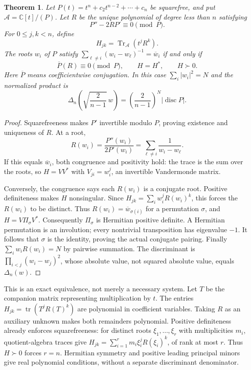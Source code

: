 \documentclass[11pt]{article}
\newtheorem{theorem}{Theorem}[section]
\theoremstyle{remark}
\newcommand{\C}{\mathbb C}
\numberwithin{equation}{section}
\begin{document}
\begin{theorem}\label{thm:trace-stationary}
Let $P(t)=t^n+c_2t^{n-2}+\cdots+c_n$ be squarefree, and put
$\mathcal A=\C[t]/(P)$. Let $R$ be the unique polynomial of degree
less than $n$ satisfying
\begin{equation}\label{eq:force-modulo}
 P''-2RP'\equiv0\pmod P.
\end{equation}
For $0\le j,k<n$, define
\begin{equation}\label{eq:trace-matrix}
 H_{jk}=\operatorname{Tr}_{\mathcal A}(t^jR^k).
\end{equation}
The roots $w_i$ of $P$ satisfy
$\sum_{\ell\ne i}(w_i-w_\ell)^{-1}=\overline w_i$ if and only if
\begin{equation}\label{eq:trace-conditions}
 \overline P(R)\equiv0\pmod P,\qquad H=H^*,\qquad H\succ0.
\end{equation}
Here $\overline P$ means coefficientwise conjugation.
In this case $\sum_i|w_i|^2=N$ and the normalized product is
\begin{equation}\label{eq:disc-normalization}
 \Delta_n\!\left(\sqrt{\frac2{n-1}}\,w\right)
   =\left(\frac2{n-1}\right)^N|\operatorname{disc}P|.
\end{equation}
\end{theorem}
\begin{proof}
Squarefreeness makes $P'$ invertible modulo $P$, proving existence
and uniqueness of $R$. At a root,
\[
 R(w_i)=\frac{P''(w_i)}{2P'(w_i)}
       =\sum_{\ell\ne i}\frac1{w_i-w_\ell}.
\]
If this equals $\overline w_i$, both congruence and positivity hold:
the trace is the sum over the roots, so $H=VV^*$ with
$V_{ji}=w_i^j$, an invertible Vandermonde matrix.

Conversely, the congruence says each $R(w_i)$ is a conjugate root.
Positive definiteness makes $H$ nonsingular. Since
$H_{jk}=\sum_i w_i^jR(w_i)^k$, this forces the $R(w_i)$ to be distinct.
Thus $R(w_i)=\overline w_{\sigma(i)}$ for a permutation $\sigma$, and
$H=V\Pi_\sigma V^*$. Consequently $\Pi_\sigma$ is Hermitian positive
definite. A Hermitian permutation is an involution; every
nontrivial transposition has eigenvalue $-1$. It follows that
$\sigma$ is the identity, proving the actual conjugate pairing.
Finally $\sum_i w_iR(w_i)=N$ by pairwise summation.
The discriminant is $\prod_{i<j}(w_i-w_j)^2$, whose absolute value,
not squared absolute value, equals $\Delta_n(w)$.
\end{proof}

This is an exact equivalence, not merely a necessary system.
Let $T$ be the companion matrix representing multiplication by $t$.
The entries $H_{jk}=\operatorname{tr}(T^jR(T)^k)$ are polynomial in
coefficient variables. Taking $R$ as an auxiliary unknown makes both
remainders polynomial. Positive definiteness already enforces
squarefreeness: for distinct roots $\xi_1,\ldots,\xi_r$ with
multiplicities $m_i$, quotient-algebra traces give
$H_{jk}=\sum_{i=1}^r m_i\xi_i^jR(\xi_i)^k$, of rank at most $r$.
Thus $H\succ0$ forces $r=n$.
Hermitian symmetry and positive leading principal minors give real
polynomial conditions, without a separate discriminant denominator.
\end{document}
